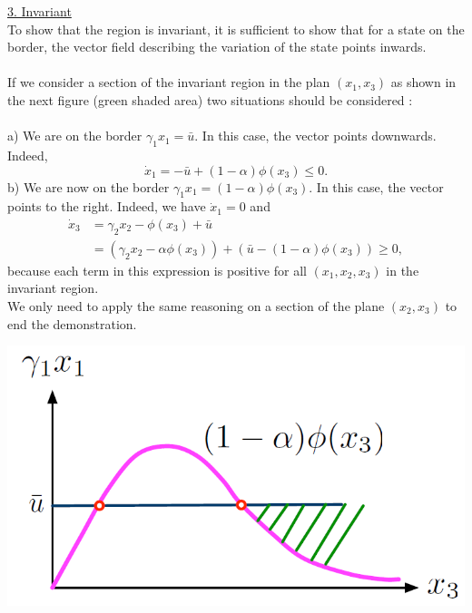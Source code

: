 \underline{3. Invariant} \\
To show that the region is invariant, it is sufficient to show that for a state on the border, the vector field describing the variation of the state points inwards. \\ \\
If we consider a section of the invariant region in the plan $(x_1,x_3)$ as shown in the next figure (green shaded area) two situations should be considered :\\ \\
\indent a) We are on the border $\gamma_1x_1 = \bar{u}$. In this case, the vector points downwards. Indeed, $$\dot{x}_1=-\bar{u}+(1-\alpha )\phi (x_3)\leq 0.$$
\indent b) We are now on the border $\gamma_1x_1 = (1-\alpha )\phi (x_3)$. In this case, the vector points to the right. Indeed, we have $\dot{x}_1 = 0$ and 
\begin{align*}
\dot{x}_3 &= \gamma_2x_2 - \phi (x_3) + \bar{u} \\
&= (\gamma_2x_2 - \alpha\phi (x_3)) + (\bar{u}-(1-\alpha)\phi (x_3)) \geq 0, 
\end{align*}
because each term in this expression is positive for all $(x_1,x_2,x_3)$ in the invariant region. \\
We only need to apply the same reasoning on a section of the plane $(x_2,x_3)$ to end the demonstration. 

{\centering
\includegraphics[scale=0.3]{Graphe7_3_3}
\label{Graphe7_3_3}

}

